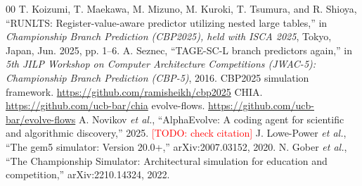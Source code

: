 \documentclass[conference]{IEEEtran}
\newcommand{\todo}[1]{\textcolor{red}{[TODO: #1]}}
\begin{document}
\begin{thebibliography}{00}
 T. Koizumi, T. Maekawa, M. Mizuno, M. Kuroki, T. Tsumura, and
R. Shioya, ``RUNLTS: Register-value-aware predictor utilizing nested large
tables,'' in \emph{Championship Branch Prediction (CBP2025), held with ISCA
2025}, Tokyo, Japan, Jun. 2025, pp. 1--6.
 A. Seznec, ``TAGE-SC-L branch predictors again,'' in
\emph{5th JILP Workshop on Computer Architecture Competitions (JWAC-5):
Championship Branch Prediction (CBP-5)}, 2016.
 CBP2025 simulation framework.
\url{https://github.com/ramisheikh/cbp2025}
 CHIA. \url{https://github.com/ucb-bar/chia}
 evolve-flows. \url{https://github.com/ucb-bar/evolve-flows}
 A. Novikov \emph{et al.}, ``AlphaEvolve: A coding agent
for scientific and algorithmic discovery,'' 2025. \todo{check citation}
 J. Lowe-Power \emph{et al.}, ``The gem5 simulator: Version
20.0+,'' arXiv:2007.03152, 2020.
 N. Gober \emph{et al.}, ``The Championship Simulator:
Architectural simulation for education and competition,'' arXiv:2210.14324,
2022.
\end{thebibliography}
\end{document}
